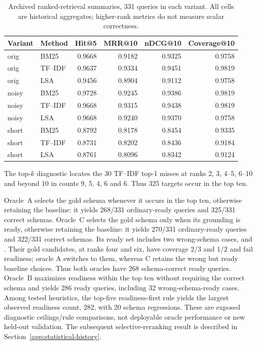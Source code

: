 \begin{table}[htbp]\centering\small
\caption{Archived ranked-retrieval summaries, 331 queries in each variant. All cells are historical aggregates; higher-rank metrics do not measure scalar correctness.}\label{tab:ranked-retrieval}
\begin{tabular}{@{}llrrrr@{}}\toprule
Variant & Method & Hit@5 & MRR@10 & nDCG@10 & Coverage@10\\\midrule
orig & BM25 & 0.9668 & 0.9182 & 0.9325 & 0.9758\\
orig & TF--IDF & 0.9637 & 0.9334 & 0.9451 & 0.9819\\
orig & LSA & 0.9456 & 0.8904 & 0.9112 & 0.9758\\
noisy & BM25 & 0.9728 & 0.9245 & 0.9386 & 0.9819\\
noisy & TF--IDF & 0.9668 & 0.9315 & 0.9438 & 0.9819\\
noisy & LSA & 0.9668 & 0.9240 & 0.9370 & 0.9758\\
short & BM25 & 0.8792 & 0.8178 & 0.8454 & 0.9335\\
short & TF--IDF & 0.8731 & 0.8202 & 0.8436 & 0.9184\\
short & LSA & 0.8761 & 0.8096 & 0.8342 & 0.9124\\
\bottomrule\end{tabular}\end{table}

The top-$k$ diagnostic locates the 30 TF--IDF top-1 misses at ranks 2, 3, 4--5, 6--10 and beyond 10 in counts 9, 5, 4, 6 and 6. Thus 325 targets occur in the top ten.

Oracle~A selects the gold schema whenever it occurs in the top ten, otherwise retaining the baseline: it yields 268/331 ordinary-ready queries and 325/331 correct schemas. Oracle~C selects the gold schema only when its grounding is ready, otherwise retaining the baseline: it yields 270/331 ordinary-ready queries and 322/331 correct schemas. Its ready set includes two wrong-schema cases,  and . Their gold candidates, at ranks four and six, have coverage $2/3$ and $1/2$ and fail readiness; oracle A switches to them, whereas C retains the wrong but ready baseline choices. Thus both oracles have 268 schema-correct ready queries. Oracle~B maximizes readiness within the top ten without requiring the correct schema and yields 286 ready queries, including 32 wrong-schema-ready cases. Among tested heuristics, the top-five readiness-first rule yields the largest observed readiness count, 282, with 20 schema regressions. These are exposed diagnostic ceilings/rule comparisons, not deployable oracle performance or new held-out validation. The subsequent selective-reranking result is described in Section~\ref{app:statistical-history}.


